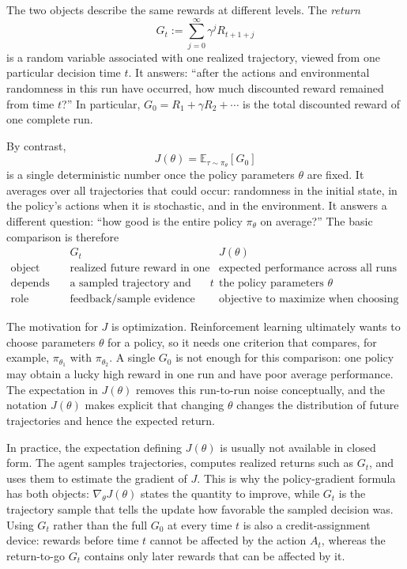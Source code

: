 \documentclass[11pt,a4paper]{article}
\theoremstyle{definition}
\begin{document}
\begin{note}
The two objects describe the same rewards at different levels. The \emph{return}
\[
G_t:=\sum_{j=0}^{\infty}\gamma^jR_{t+1+j}
\]
is a random variable associated with one realized trajectory, viewed from one particular
decision time $t$. It answers: ``after the actions and environmental randomness in this run
have occurred, how much discounted reward remained from time $t$?'' In particular,
$G_0=R_1+\gamma R_2+\cdots$ is the total discounted reward of one complete run.

By contrast,
\[
J(\theta)=\mathbb{E}_{\tau\sim\pi_\theta}[G_0]
\]
is a single deterministic number once the policy parameters $\theta$ are fixed. It averages
over all trajectories that could occur: randomness in the initial state, in the policy's
actions when it is stochastic, and in the environment. It answers a different question:
``how good is the entire policy $\pi_\theta$ on average?'' The basic comparison is therefore
\[
\begin{array}{c|c|c}
& G_t & J(\theta)\\
\hline
\text{object} & \text{realized future reward in one run} &
\text{expected performance across all runs}\\
\text{depends on} & \text{a sampled trajectory and time }t &
\text{the policy parameters }\theta\\
\text{role} & \text{feedback/sample evidence} &
\text{objective to maximize when choosing a policy}
\end{array}
\]

The motivation for $J$ is optimization. Reinforcement learning ultimately wants to choose
parameters $\theta$ for a policy, so it needs one criterion that compares, for example,
$\pi_{\theta_1}$ with $\pi_{\theta_2}$. A single $G_0$ is not enough for this comparison:
one policy may obtain a lucky high reward in one run and have poor average performance. The
expectation in $J(\theta)$ removes this run-to-run noise conceptually, and the notation
$J(\theta)$ makes explicit that changing $\theta$ changes the distribution of future
trajectories and hence the expected return.

In practice, the expectation defining $J(\theta)$ is usually not available in closed form.
The agent samples trajectories, computes realized returns such as $G_t$, and uses them to
estimate the gradient of $J$. This is why the policy-gradient formula has both objects:
$\nabla_\theta J(\theta)$ states the quantity to improve, while $G_t$ is the trajectory sample
that tells the update how favorable the sampled decision was. Using $G_t$ rather than the full
$G_0$ at every time $t$ is also a credit-assignment device: rewards before time $t$ cannot be
affected by the action $A_t$, whereas the return-to-go $G_t$ contains only later rewards that
can be affected by it.
\end{note}
\end{document}
